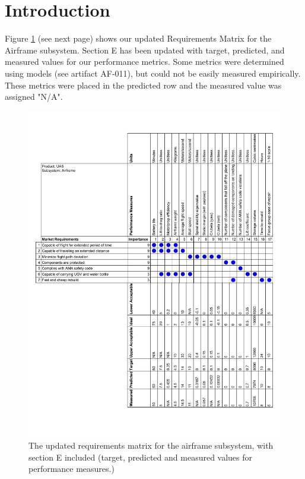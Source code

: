 \documentclass[]{auvsi_doc}
\begin{document}
\begin{AUVSITitlePage}
\begin{artifacttable}
\end{artifacttable}
\end{AUVSITitlePage}

\section{Introduction}
Figure \ref{fig:reqmatrix} (see next page) shows our updated Requirements Matrix for the Airframe subsystem. Section E has been updated with target, predicted, and measured values for our performance metrics. Some metrics were determined using models (see artifact AF-011), but could not be easily measured empirically. These metrics were placed in the predicted row and the measured value was assigned "N/A".


\begin{figure}[h!]
	\centering
	\includegraphics[width=1.0\textwidth]{reqmatrix.pdf}
	\caption{The updated requirements matrix for the airframe subsystem, with section E included (target, predicted and measured values for performance measures.)}
	\label{fig:reqmatrix}
\end{figure}
\end{document}
